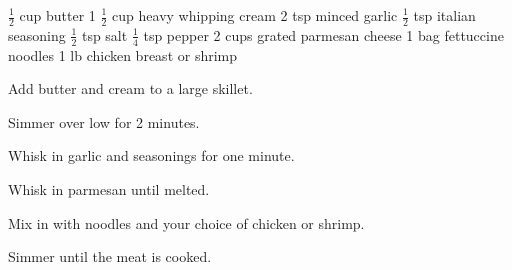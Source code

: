 \dishtype{}
\begin{ingreds}
    $\frac{1}{2}$ cup butter
    1 $\frac{1}{2}$ cup heavy whipping cream
    2 tsp minced garlic
    $\frac{1}{2}$ tsp italian seasoning
    $\frac{1}{2}$ tsp salt
    $\frac{1}{4}$ tsp pepper
    2 cups grated parmesan cheese
    1 bag fettuccine noodles
    1 lb chicken breast or shrimp
\end{ingreds}
\begin{method}
    Add butter and cream to a large skillet.\par
    Simmer over low for 2 minutes.\par
    Whisk in garlic and seasonings for one minute.\par
    Whisk in parmesan until melted.\par
    Mix in with noodles and your choice of chicken or shrimp.\par
    Simmer until the meat is cooked.
\end{method}